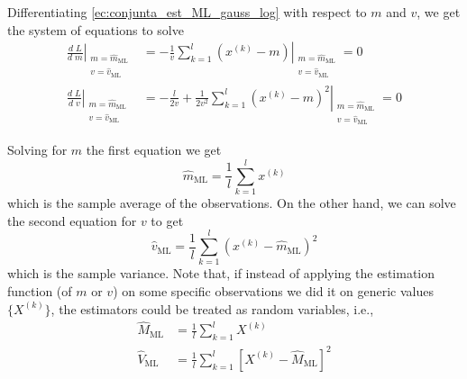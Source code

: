 \begin{example}
Differentiating \eqref{ec:conjunta_est_ML_gauss_log} with respect to $m$ and $v$, we get the system of equations to solve
\begin{equation}
\begin{split}
\left.\frac{d\;L}{d\;m} \right|_{\begin{array}{l} m = \hat m_{\text{ML}} \\ v = \hat v_{\text{ML}} \end{array}} & = \left. -\frac{1}{v} \sum_{k=1}^{l} (x^{(k)} - m)\right|_{\begin{array}{l} m = \hat m_{\text{ML}} \\ v = \hat v_{\text{ML}} \end{array}}= 0\\
\left.\frac{d\;L}{d\;v} \right|_{\begin{array}{l} m = \hat m_{\text{ML}} \\ v = \hat v_{\text{ML}} \end{array}} & = \left. -\frac{l}{2v} + \frac{1}{2 v^2} \sum_{k=1}^l (x^{(k)}-m)^2 \right|_{\begin{array}{l} m = \hat m_{\text{ML}} \\ v = \hat v_{\text{ML}} \end{array}}= 0
\end{split}
\end{equation}

Solving for $m$ the first equation we get
\begin{equation}
\hat m_{\text{ML}} = \frac{1}{l} \sum_{k=1}^l x^{(k)}
\end{equation}
which is the sample average of the observations. On the other hand, we can solve the second equation for $v$ to get
\begin{equation}
\hat v_{\text{ML}} = \frac{1}{l} \sum_{k=1}^l (x^{(k)}-\hat m_{\text{ML}})^2
\end{equation}
which is the sample variance. Note that, if instead of applying the estimation function (of $m$ or $v$) on some specific observations we did it on generic values $\{X^{(k)}\}$, the estimators could be treated as random variables, i.e.,
\begin{align}
\hat M_{\text{ML}} &= \frac{1}{l} \sum_{k=1}^l X^{(k)}   \\
\hat V_{\text{ML}} &= \frac{1}{l} \sum_{k=1}^l [X^{(k)}-\hat M_{\text{ML}}]^2
\end{align}


\end{example}\vspace{0.4cm}
